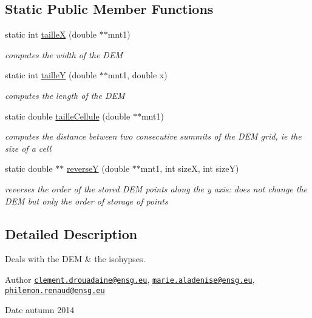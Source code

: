 \subsection*{Static Public Member Functions}
\begin{DoxyCompactItemize}
\item 
static int \hyperlink{classmnt_a8a8f2b44f86b8aa1e015a4561c45b2f5}{taille\+X} (double $\ast$$\ast$mnt1)
\begin{DoxyCompactList}\small\item\em computes the width of the D\+E\+M \end{DoxyCompactList}\item 
static int \hyperlink{classmnt_a0c36bebbff1e1e169c3c1f076d3d3fe3}{taille\+Y} (double $\ast$$\ast$mnt1, double x)
\begin{DoxyCompactList}\small\item\em computes the length of the D\+E\+M \end{DoxyCompactList}\item 
static double \hyperlink{classmnt_a835c343bc40750a430670e4f8a4e9f28}{taille\+Cellule} (double $\ast$$\ast$mnt1)
\begin{DoxyCompactList}\small\item\em computes the distance between two consecutive summits of the D\+E\+M grid, ie the size of a cell \end{DoxyCompactList}\item 
static double $\ast$$\ast$ \hyperlink{classmnt_a84cca90b4de0a485d27940cb6bc96b41}{reverse\+Y} (double $\ast$$\ast$mnt1, int size\+X, int size\+Y)
\begin{DoxyCompactList}\small\item\em reverses the order of the stored D\+E\+M points along the y axis\+: does not change the D\+E\+M but only the order of storage of points \end{DoxyCompactList}\end{DoxyCompactItemize}


\subsection{Detailed Description}
Deals with the D\+E\+M \& the isohypses. 

\begin{DoxyAuthor}{Author}
\href{mailto:clement.drouadaine@ensg.eu}{\tt clement.\+drouadaine@ensg.\+eu}, \href{mailto:marie.aladenise@ensg.eu}{\tt marie.\+aladenise@ensg.\+eu}, \href{mailto:philemon.renaud@ensg.eu}{\tt philemon.\+renaud@ensg.\+eu} 
\end{DoxyAuthor}
\begin{DoxyDate}{Date}
autumn 2014 
\end{DoxyDate}


